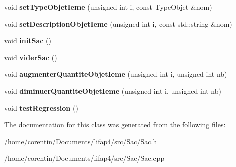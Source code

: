 \begin{DoxyCompactItemize}
void {\bfseries set\+Type\+Objet\+Ieme} (unsigned int i, const Type\+Objet \&nom)
\item 
\mbox{\label{class_sac_a2f3d0ad14dea6dc1b8785ee2aa42dae9}} 
void {\bfseries set\+Description\+Objet\+Ieme} (unsigned int i, const std\+::string \&nom)
\item 
\mbox{\label{class_sac_a568f800ad7ed33cafc6351cd778ac017}} 
void {\bfseries init\+Sac} ()
\item 
\mbox{\label{class_sac_af291d902c93e5157bcfa5d2f24bff291}} 
void {\bfseries vider\+Sac} ()
\item 
\mbox{\label{class_sac_a1dee8b8525a1e9c00a8f0f3da5cdd4d2}} 
void {\bfseries augmenter\+Quantite\+Objet\+Ieme} (unsigned int i, unsigned int nb)
\item 
\mbox{\label{class_sac_aac56c261612ca7c522ebee38644fbb98}} 
void {\bfseries diminuer\+Quantite\+Objet\+Ieme} (unsigned int i, unsigned int nb)
\item 
\mbox{\label{class_sac_abe28c6d7970457e6ebf9850a762054e5}} 
void {\bfseries test\+Regression} ()
\end{DoxyCompactItemize}


The documentation for this class was generated from the following files\+:\begin{DoxyCompactItemize}
\item 
/home/corentin/\+Documents/lifap4/src/\+Sac/Sac.\+h\item 
/home/corentin/\+Documents/lifap4/src/\+Sac/Sac.\+cpp\end{DoxyCompactItemize}
